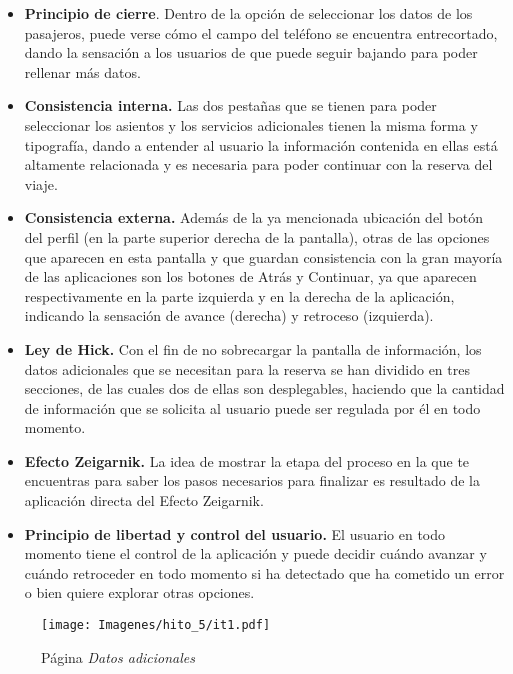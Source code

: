 \begin{itemize}
    \item \textbf{Principio de cierre}. Dentro de la opción de seleccionar los datos de los pasajeros, puede verse
        cómo el campo del teléfono se encuentra entrecortado, dando la sensación a los usuarios de que puede seguir
        bajando para poder rellenar más datos.
    \item \textbf{Consistencia interna.} Las dos pestañas que se tienen para poder seleccionar los asientos y los servicios
        adicionales tienen la misma forma y tipografía, dando a entender al usuario la información contenida en
        ellas está altamente relacionada y es necesaria para poder continuar con la reserva del viaje.
    \item \textbf{Consistencia externa.} Además de la ya mencionada ubicación del botón del perfil (en la parte superior
        derecha de la pantalla), otras de las opciones que aparecen en esta pantalla y que guardan consistencia
        con la gran mayoría de las aplicaciones son los botones de Atrás y Continuar, ya que aparecen respectivamente
        en la parte izquierda y en la derecha de la aplicación, indicando la sensación de avance (derecha) y retroceso
        (izquierda).
    \item \textbf{Ley de Hick.} Con el fin de no sobrecargar la pantalla de información, los datos adicionales que se necesitan
        para la reserva se han dividido en tres secciones, de las cuales dos de ellas son desplegables, haciendo que
        la cantidad de información que se solicita al usuario puede ser regulada por él en todo momento.
    \item \textbf{Efecto Zeigarnik.} La idea de mostrar la etapa del proceso en la que te encuentras para saber los pasos
        necesarios para finalizar es resultado de la aplicación directa del Efecto Zeigarnik.
    \item \textbf{Principio de libertad y control del usuario.} El usuario en todo momento tiene el control de la aplicación
        y puede decidir cuándo avanzar y cuándo retroceder en todo momento si ha detectado que ha cometido un error
        o bien quiere explorar otras opciones.
\end{itemize}

\begin{figure}[H]
    \centering
    \texttt{[image: Imagenes/hito\_5/it1.pdf]}
    \caption{Página \textit{Datos adicionales}}
    \label{fig:it1_datos_adicionales}
\end{figure}

